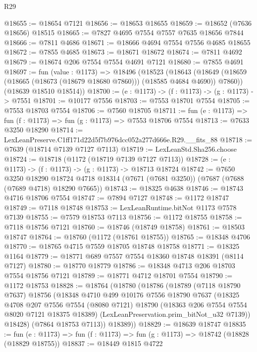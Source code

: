 \begin{lexlean}{R29}
\begin{coremodule}
@18655 := @18654 @7121
@18656 := @18653 @18655
@18659 := @18652 (@7636 @18656) @18515
@18665 := @7827 @4695 @7554 @7557 @7635 @18656 @7844
@18666 := @7811 @4686
@18671 := @18666 @4694 @7554 @7556 @4685 @18655
@18672 := @7855 @4685
@18673 := @18671 @18672
@18674 := @7811 @4692
@18679 := @18674 @206 @7554 @7554 @4691 @7121
@18680 := @7855 @4691
@18697 := fun (value : @1173) =>
  @18496
    (@18523
      (@18643 (@18649 (@18659 (@18665 (@18673 (@18679 @18680 @7860))) (@18585 @4684 @4690)) @7860))
      (@18639 @18510 @18514))
@18700 := (e : @1173) -> (f : @1173) -> (g : @1173) -> @7551
@18701 := @10177 @7556
@18703 := @7553 @18701 @7554
@18705 := @7553 @18703 @7554
@18706 := @7560 @18705
@18711 := fun (e : @1173) => fun (f : @1173) => fun (g : @1173) => @7553 @18706 @7554
@18713 := @7633 @3250 @18290
@18714 := LexLeanPreserve.C1ff171d22d5f7b976dcc052a277d666e.R29.__fits_88
@18718 := @7639 (@18714 @7139 @7127 @7113)
@18719 := LexLeanStd.Sha256.choose
@18724 := @18718 (@1172 (@18719 @7139 @7127 @7113))
@18728 := (e : @1173) -> (f : @1173) -> (g : @1173) -> @18713 @18724
@18742 := @7650
    @3250
    @18290
    @18724
    @4718
    @18314
    (@7671 (@7681 @3250))
    (@7687 (@7688 (@7689 @4718) @18290 @7665))
@18743 := @18325 @4638
@18746 := @18743 @4716 @18706 @7554
@18747 := @7894 @7127
@18748 := @1172 @18747
@18749 := @7118 @18748
@18753 := LexLeanRuntime.bitNot @1173 @7578 @7139
@18755 := @7579 @18753 @7113
@18756 := @1172 @18755
@18758 := @7118 @18756 @7121
@18760 := @18746 (@18749 @18758)
@18761 := @18503 @18747
@18764 := @18760 (@1172 (@18761 @18755))
@18765 := @18348 @4706
@18770 := @18765 @4715 @7559 @18705 @18748 @18758
@18771 := @18325 @1164
@18779 := @18771 @689 @7557 @7554 @18360 @18748 @18391 (@8114 @7127)
@18780 := @18770 @18779
@18786 := @18348 @4713 @206 @18703 @7554 @18756 @7121
@18789 := @18771 @4712 @18701 @7554
@18790 := @1172 @18753
@18828 := @18764
    (@18780
      (@18786
        (@18789
          (@7118 @18790 @7637)
          @18756
          (@18348
            @4710
            @499
            @10176
            @7556
            @18790
            @7637
            (@18325
              @4708
              @207
              @7556
              @7554
              (@8080 @7121)
              @18790
              (@18363 @206 @7554 @7554 @8020 @7121 @18375 @18389)
              (LexLeanPreservation.prim_bitNot_u32 @7139))
            @18428)
          (@7864 @18753 @7113))
        @18389))
@18829 := @18639 @18747
@18835 := fun (e : @1173) => fun (f : @1173) => fun (g : @1173) => @18742 (@18828 (@18829 @18755))
@18837 := @18449 @1815 @4722

\end{coremodule}
\end{lexlean}

